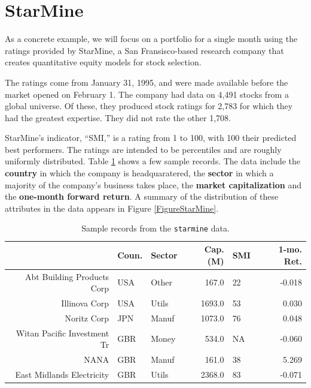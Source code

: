 \documentclass{article}\usepackage{graphicx, color}
\begin{document}
\section{StarMine}




As a concrete example, we will focus on a portfolio for a single month
using the ratings provided by StarMine, a San Fransisco-based research
company that creates quantitative equity models for stock selection.

The ratings come from January 31, 1995,
and were made available before the market opened on February 1. The
company had data on 4,491
stocks from a global universe. Of these, they produced stock ratings
for 2,783 for
which they had the greatest expertise. They did not rate the other
1,708.

StarMine's indicator, ``SMI,'' is a rating from 1 to
100, with 100 their predicted best performers. The ratings are
intended to be percentiles and are roughly
uniformly distributed. Table \ref{TableStarMine} shows a few
sample records. The data include the \textbf{country} in which the
company is headquaratered, the \textbf{sector} in which a majority of
the company's business takes place, the \textbf{market capitalization}
and the \textbf{one-month forward return}. A summary of the
distribution of these attributes in the data appears in Figure
\ref{FigureStarMine}.

\begin{table}[ht]
\centering
\begin{tabular}{rllrlr}
  \hline
 & Coun. & Sector & Cap. (M) & SMI & 1-mo. Ret. \\ 
  \hline
Abt Building Products Corp & USA & Other & 167.0 & 22 & -0.018 \\ 
  Illinova Corp & USA & Utils & 1693.0 & 53 & 0.030 \\ 
  Noritz Corp & JPN & Manuf & 1073.0 & 76 & 0.048 \\ 
  Witan Pacific Investment Tr & GBR & Money & 534.0 & NA & -0.060 \\ 
  NANA & GBR & Manuf & 161.0 & 38 & 5.269 \\ 
  East Midlands Electricity & GBR & Utils & 2368.0 & 83 & -0.071 \\ 
   \hline
\end{tabular}
\caption{Sample records from the \texttt{starmine} data.} 
\label{TableStarMine}
\end{table}
\end{document}
